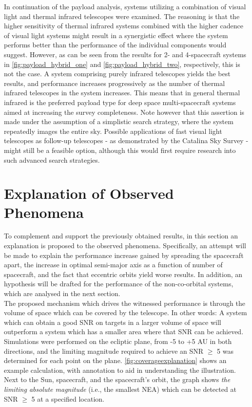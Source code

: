 In continuation of the payload analysis, systems utilizing a combination of visual light and thermal infrared telescopes were examined. The reasoning is that the higher sensitivity of thermal infrared systems combined with the higher cadence of visual light systems might result in a synergistic effect where the system performs better than the performance of the individual components would suggest. However, as can be seen from the results for 2- and 4-spacecraft systems in \autoref{fig:payload_hybrid_one} and \autoref{fig:payload_hybrid_two}, respectively, this is not the case. A system comprising purely infrared telescopes yields the best results, and performance increases progressively as the number of thermal infrared telescopes in the system increases. This means that in general thermal infrared is the preferred payload type for deep space multi-spacecraft systems aimed at increasing the survey completeness. Note however that this assertion is made under the assumption of a simplistic search strategy, where the system repeatedly images the entire sky. Possible applications of fast visual light telescopes as follow-up telescopes - as demonstrated by the Catalina Sky Survey - might still be a feasible option, although this would first require research into such advanced search strategies.



\section{Explanation of Observed Phenomena}
\label{sec:results_explanation}
To complement and support the previously obtained results, in this section an explanation is proposed to the observed phenomena. Specifically, an attempt will be made to explain the performance increase gained by spreading the spacecraft apart, the increase in optimal semi-major axis as a function of number of spacecraft, and the fact that eccentric orbits yield worse results. In addition, an hypothesis will be drafted for the performance of the non-co-orbital systems, which are analysed in the next section. \\

The proposed mechanism which drives the witnessed performance is through the volume of space which can be covered by the telescope. In other words: A system which can obtain a good SNR on targets in a larger volume of space will outperform a system which has a smaller area where that SNR can be achieved. Simulations were performed on the ecliptic plane, from -5 to +5 AU in both directions, and the limiting magnitude required to achieve an SNR $\geq$ 5 was determined for each point on the plane. \autoref{fig:coverageexplanation} shows an example calculation, with annotation to aid in understanding the illustration. Next to the Sun, spacecraft, and the spacecraft's orbit, the graph shows \textit{the limiting absolute magnitude} (i.e., the smallest NEA) which can be detected at SNR $\geq$ 5 at a specified location.\\

